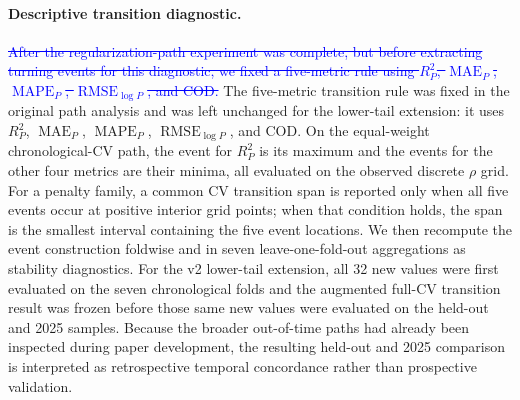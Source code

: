 \documentclass[10pt]{article}
\theoremstyle{definition}
\newcommand{\1}{\mathbf{1}}
\newcommand{\oldtext}[1]{\textcolor{blue}{\sout{#1}}}
\newcommand{\latesttext}[1]{\textcolor{latestPurple}{#1}}
\begin{document}
\paragraph{\latesttext{Descriptive transition diagnostic.}}
\oldtext{After the regularization-path experiment was complete, but before extracting turning events for this diagnostic, we fixed a five-metric rule using $R^2_P$, $\operatorname{MAE}_P$, $\operatorname{MAPE}_P$, $\operatorname{RMSE}_{\log P}$, and COD.}
\latesttext{The five-metric transition rule was fixed in the original path analysis and was left unchanged for the lower-tail extension: it uses $R^2_P$, $\operatorname{MAE}_P$, $\operatorname{MAPE}_P$, $\operatorname{RMSE}_{\log P}$, and COD. On the equal-weight chronological-CV path, the event for $R^2_P$ is its maximum and the events for the other four metrics are their minima, all evaluated on the observed discrete $\rho$ grid. For a penalty family, a common CV transition span is reported only when all five events occur at positive interior grid points; when that condition holds, the span is the smallest interval containing the five event locations. We then recompute the event construction foldwise and in seven leave-one-fold-out aggregations as stability diagnostics. For the v2 lower-tail extension, all 32 new values were first evaluated on the seven chronological folds and the augmented full-CV transition result was frozen before those same new values were evaluated on the held-out and 2025 samples. Because the broader out-of-time paths had already been inspected during paper development, the resulting held-out and 2025 comparison is interpreted as retrospective temporal concordance rather than prospective validation.}
\end{document}
